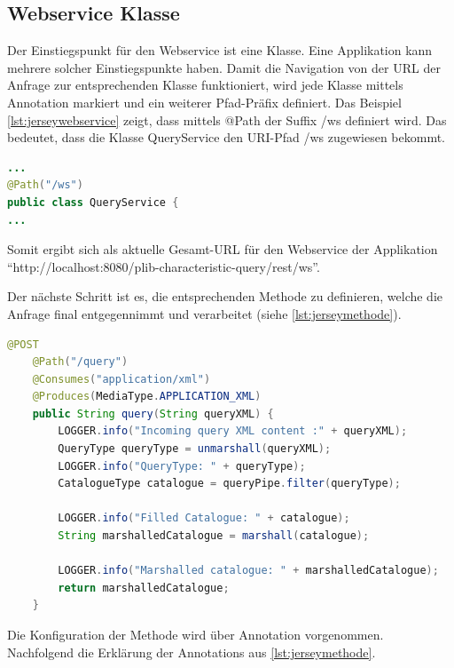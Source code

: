 \subsection{Webservice Klasse}
Der Einstiegspunkt für den \gls{Webservice} ist eine Klasse. Eine Applikation kann mehrere solcher Einstiegspunkte haben. Damit die Navigation von der \gls{URL} der Anfrage zur entsprechenden Klasse funktioniert, wird jede Klasse mittels Annotation markiert und ein weiterer Pfad-Präfix definiert. Das Beispiel 
\autoref{lst:jerseywebservice} zeigt, dass mittels @Path der Suffix /ws definiert wird. Das bedeutet, dass die Klasse QueryService den \gls{URI}-Pfad /ws zugewiesen bekommt. 
  \begin{lstlisting}[caption=Jersey Webservice Klasse, language=Java, label=lst:jerseywebservice]
...
@Path("/ws")
public class QueryService {
...
 \end{lstlisting}  
 
Somit ergibt sich als aktuelle Gesamt-\gls{URL} für den \gls{Webservice} der Applikation \\  \enquote{http://localhost:8080/plib-characteristic-query/rest/ws}.
 
Der nächste Schritt ist es, die entsprechenden Methode zu definieren, welche die Anfrage final entgegennimmt und verarbeitet (siehe \autoref{lst:jerseymethode}). 
 
  \begin{lstlisting}[caption=Jersey Methode, language=Java, label=lst:jerseymethode]
    @POST
    @Path("/query")
    @Consumes("application/xml")
    @Produces(MediaType.APPLICATION_XML)
    public String query(String queryXML) {
        LOGGER.info("Incoming query XML content :" + queryXML);
        QueryType queryType = unmarshall(queryXML);
        LOGGER.info("QueryType: " + queryType);
        CatalogueType catalogue = queryPipe.filter(queryType);

        LOGGER.info("Filled Catalogue: " + catalogue);
        String marshalledCatalogue = marshall(catalogue);

        LOGGER.info("Marshalled catalogue: " + marshalledCatalogue);
        return marshalledCatalogue;
    }
 \end{lstlisting}  

Die Konfiguration der Methode wird über \Gls{Annotation} vorgenommen. Nachfolgend die Erklärung der \Glspl{Annotation} aus \autoref{lst:jerseymethode}.

